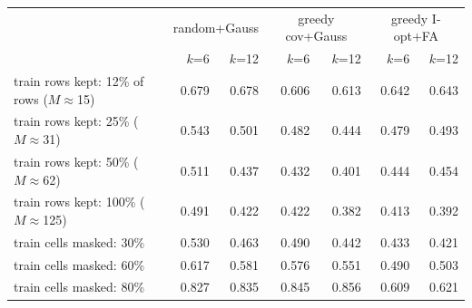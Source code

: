 \begin{tabular}{lrrrrrr}\toprule
 & \multicolumn{2}{c}{random+Gauss} & \multicolumn{2}{c}{greedy cov+Gauss} & \multicolumn{2}{c}{greedy I-opt+FA} \\
 & $k$=6 & $k$=12 & $k$=6 & $k$=12 & $k$=6 & $k$=12 \\\midrule
train rows kept: 12\% of rows ($M\approx$15) & 0.679 & 0.678 & 0.606 & 0.613 & 0.642 & 0.643 \\
train rows kept: 25\% ($M\approx$31) & 0.543 & 0.501 & 0.482 & 0.444 & 0.479 & 0.493 \\
train rows kept: 50\% ($M\approx$62) & 0.511 & 0.437 & 0.432 & 0.401 & 0.444 & 0.454 \\
train rows kept: 100\% ($M\approx$125) & 0.491 & 0.422 & 0.422 & 0.382 & 0.413 & 0.392 \\
\midrule
train cells masked: 30\% & 0.530 & 0.463 & 0.490 & 0.442 & 0.433 & 0.421 \\
train cells masked: 60\% & 0.617 & 0.581 & 0.576 & 0.551 & 0.490 & 0.503 \\
train cells masked: 80\% & 0.827 & 0.835 & 0.845 & 0.856 & 0.609 & 0.621 \\
\bottomrule\end{tabular}
